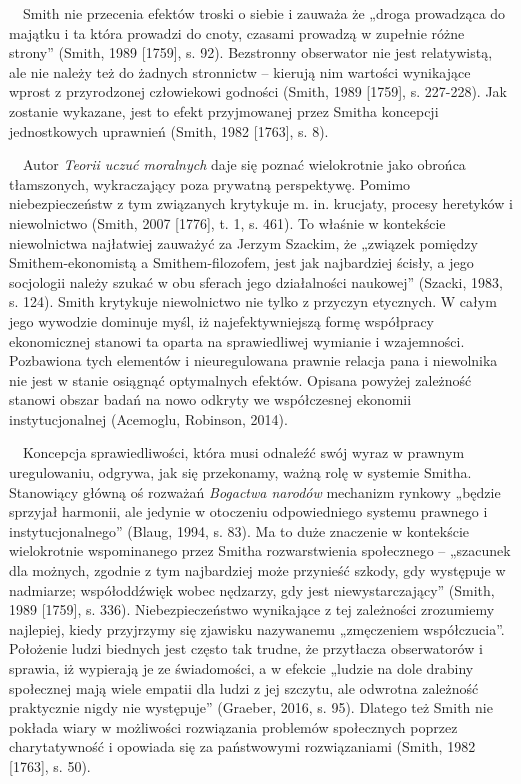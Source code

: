 \documentclass[a4paper]{article}
\begin{document}
 \ \  Smith nie przecenia efektów troski o siebie i zauważa że „droga prowadząca do majątku i ta która prowadzi do cnoty, czasami prowadzą w zupełnie różne strony” \label{ref:RNDo3EelCAtEP}(Smith, 1989 [1759], s. 92). Bezstronny obserwator nie jest relatywistą, ale nie należy też do żadnych stronnictw – kierują nim wartości wynikające wprost z przyrodzonej człowiekowi godności \label{ref:RNDCU5LDHfghn}(Smith, 1989 [1759], s. 227-228). Jak zostanie wykazane, jest to efekt przyjmowanej przez Smitha koncepcji jednostkowych uprawnień \label{ref:RNDBHV5ZarCoy}(Smith, 1982 [1763], s. 8). 

 \ \ Autor \textit{Teorii uczuć moralnych} daje się poznać wielokrotnie jako obrońca tłamszonych, wykraczający poza prywatną perspektywę. Pomimo niebezpieczeństw z tym związanych krytykuje m. in. krucjaty, procesy heretyków i niewolnictwo \label{ref:RNDkKZBWJ1Bu0}(Smith, 2007 [1776], t. 1, s. 461). To właśnie w kontekście niewolnictwa najłatwiej zauważyć za Jerzym Szackim, że „związek pomiędzy Smithem-ekonomistą a Smithem-filozofem, jest jak najbardziej ścisły, a jego socjologii należy szukać w obu sferach jego działalności naukowej” \label{ref:RNDC8VLy7vrzx}(Szacki, 1983, s. 124). Smith krytykuje niewolnictwo nie tylko z przyczyn etycznych. W całym jego wywodzie dominuje myśl, iż najefektywniejszą formę współpracy ekonomicznej stanowi ta oparta na sprawiedliwej wymianie i wzajemności. Pozbawiona tych elementów i nieuregulowana prawnie relacja pana i niewolnika nie jest w stanie osiągnąć optymalnych efektów. Opisana powyżej zależność stanowi obszar badań na nowo odkryty we współczesnej ekonomii instytucjonalnej \label{ref:RNDvpwxutjCAN}(Acemoglu, Robinson, 2014).

\ \ Koncepcja sprawiedliwości, która musi odnaleźć swój wyraz w prawnym uregulowaniu, odgrywa, jak się przekonamy, ważną rolę w systemie Smitha. Stanowiący główną oś rozważań \textit{Bogactwa narodów} mechanizm rynkowy „będzie sprzyjał harmonii, ale jedynie w otoczeniu odpowiedniego systemu prawnego i instytucjonalnego” \label{ref:RNDuJ77RGCwoa}(Blaug, 1994, s. 83). Ma to duże znaczenie w kontekście wielokrotnie wspominanego przez Smitha rozwarstwienia społecznego – „szacunek dla możnych, zgodnie z tym najbardziej może przynieść szkody, gdy występuje w nadmiarze; współoddźwięk wobec nędzarzy, gdy jest niewystarczający” \label{ref:RNDu4UprONNkk}(Smith, 1989 [1759], s. 336). Niebezpieczeństwo wynikające z tej zależności zrozumiemy najlepiej, kiedy przyjrzymy się zjawisku nazywanemu „zmęczeniem współczucia”. Położenie ludzi biednych jest często tak trudne, że przytłacza obserwatorów i sprawia, iż wypierają je ze świadomości, a w efekcie „ludzie na dole drabiny społecznej mają wiele empatii dla ludzi z jej szczytu, ale odwrotna zależność praktycznie nigdy nie występuje” \label{ref:RNDNWyWu164di}(Graeber, 2016, s. 95). Dlatego też Smith nie pokłada wiary w możliwości rozwiązania problemów społecznych poprzez charytatywność i opowiada się za państwowymi rozwiązaniami \label{ref:RNDLkHuKp1To6}(Smith, 1982 [1763], s. 50).
\end{document}
